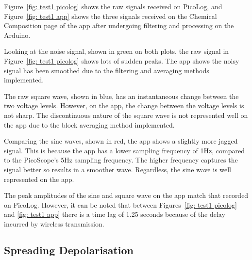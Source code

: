Figure~\ref{fig: test1 picolog} shows the raw signals received on PicoLog, and Figure~\ref{fig: test1 app} shows the three signals received on the Chemical Composition page of the app after undergoing filtering and processing on the Arduino. 

Looking at the noise signal, shown in green on both plots, the raw signal in Figure~\ref{fig: test1 picolog} shows lots of sudden peaks. The app shows the noisy signal has been smoothed due to the filtering and averaging methods implemented. 

The raw square wave, shown in blue, has an instantaneous change between the two voltage levels. However, on the app, the change between the voltage levels is not sharp. The discontinuous nature of the square wave is not represented well on the app due to the block averaging method implemented. 

Comparing the sine waves, shown in red, the app shows a slightly more jagged signal. This is because the app has a lower sampling frequency of 1Hz, compared to the PicoScope's 5Hz sampling frequency. The higher frequency captures the signal better so results in a smoother wave. Regardless, the sine wave is  well represented on the app.

The peak amplitudes of the sine and square wave on the app match that recorded on PicoLog. However, it can be noted that between Figures~\ref{fig: test1 picolog} and \ref{fig: test1 app} there is a time lag of 1.25 seconds because of the delay incurred by wireless transmission.


\subsection{Spreading Depolarisation}
